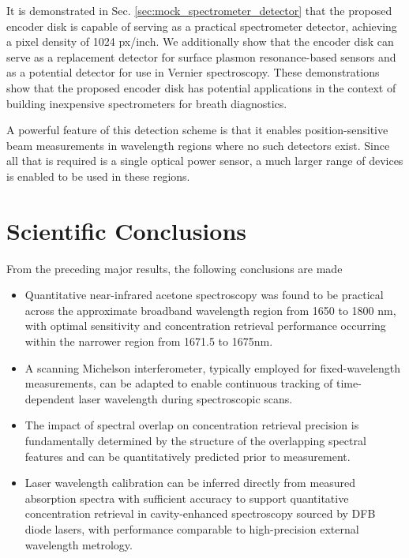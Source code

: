 \documentclass[8pt,a4paper]{report}
\begin{document}
	It is demonstrated in Sec. \ref{sec:mock_spectrometer_detector} that the proposed encoder disk is capable of serving as a practical spectrometer detector, achieving a pixel density of 1024 px/inch. We additionally show that the encoder disk can serve as a replacement detector for surface plasmon resonance-based sensors and as a potential detector for use in Vernier spectroscopy. These demonstrations show that the proposed encoder disk has potential applications in the context of building inexpensive spectrometers for breath diagnostics.
	
	A powerful feature of this detection scheme is that it enables position-sensitive beam measurements in wavelength regions where no such detectors exist. Since all that is required is a single optical power sensor, a much larger range of devices is enabled to be used in these regions.
	
	\section{Scientific Conclusions}
	From the preceding major results, the following conclusions are made
	\begin{itemize}
		\item Quantitative near-infrared acetone spectroscopy was found to be practical across the approximate broadband wavelength region from 1650 to 1800 nm, with optimal sensitivity and concentration retrieval performance occurring within the narrower region from 1671.5 to 1675nm.
		
		\item A scanning Michelson interferometer, typically employed for fixed-wavelength measurements, can be adapted to enable continuous tracking of time-dependent laser wavelength during spectroscopic scans.
		
		\item The impact of spectral overlap on concentration retrieval precision is fundamentally determined by the structure of the overlapping spectral features and can be quantitatively predicted prior to measurement.
		
		\item Laser wavelength calibration can be inferred directly from measured absorption spectra with sufficient accuracy to support quantitative concentration retrieval in cavity-enhanced spectroscopy sourced by DFB diode lasers, with performance comparable to high-precision external wavelength metrology.
	\end{itemize}
	
\end{document}
